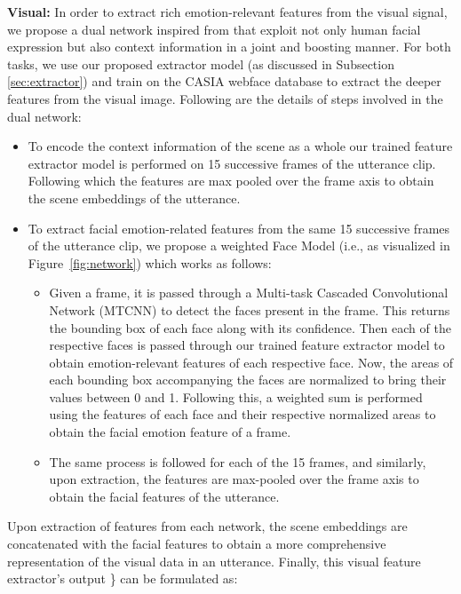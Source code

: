 \documentclass[10pt,twocolumn,letterpaper]{article}
\begin{document}
\textbf{Visual:} In order to extract rich emotion-relevant features from the visual signal, we propose a dual network inspired from \cite{lee2019context} that exploit not only human facial expression but also context information in a joint and boosting manner. For both tasks, we use our proposed extractor model (as discussed in Subsection \ref{sec:extractor}) and train on the CASIA webface database \cite{CASIA} to extract the deeper features from the visual image. Following are the details of steps involved in the dual network:
\begin{itemize}
\item To encode the context information of the scene as a whole our trained feature extractor model is performed on 15 successive frames of the utterance clip. Following which the features are max pooled over the frame axis to obtain the scene embeddings of the utterance. 
    
    \item To extract facial emotion-related features from the same 15 successive frames of the utterance clip, we propose a weighted Face Model (i.e., as visualized in Figure~\ref{fig:network}) which works as follows: 
    \begin{itemize}
        \item Given a frame, it is passed through a Multi-task Cascaded Convolutional Network (MTCNN) \cite{7553523} to detect the faces present in the frame. This returns the bounding box of each face along with its confidence. Then each of the respective faces is passed through our trained feature extractor model to obtain emotion-relevant features of each respective face. Now, the areas of each bounding box accompanying the faces are normalized to bring their values between 0 and 1. Following this, a weighted sum is performed using the features of each face and their respective normalized areas to obtain the facial emotion feature of a frame.
        \item The same process is followed for each of the 15 frames, and similarly, upon extraction, the features are max-pooled over the frame axis to obtain the facial features of the utterance.
    \end{itemize}
\end{itemize}

Upon extraction of features from each network, the scene embeddings are concatenated with the facial features to obtain a more comprehensive representation of the visual data in an utterance. Finally, this visual feature extractor's output \} can be formulated as:
\end{document}
